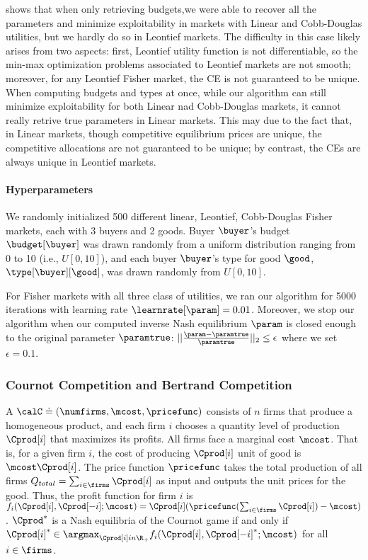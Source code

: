  shows that when only retrieving budgets,we were able to recover all the parameters and minimize exploitability in markets with Linear and Cobb-Douglas utilities, but we hardly do so in Leontief markets. The difficulty in this case likely arises from two aspects: first, Leontief utility function is not differentiable, so the min-max optimization problems associated to Leontief
markets are not smooth; moreover, for any Leontief Fisher market, the CE is not guaranteed to be unique. 
When computing budgets and types at once, while our algorithm can still minimize exploitability for both Linear nad Cobb-Douglas markets, it cannot really retrive true parameters in Linear markets. This may due to the fact that, in Linear markets, though competitive equilibrium prices are unique, the competitive allocations are not guaranteed to be unique; by contrast, the CEs are always unique in Leontief markets. 

\paragraph{Hyperparameters}
We randomly initialized 500 different linear, Leontief, Cobb-Douglas Fisher markets, each with 3 buyers and 2 goods. Buyer $\buyer$’s budget $\budget[\buyer]$ was drawn randomly from a uniform distribution ranging from 0 to 10 (i.e., $U[0,10]$), and each buyer $\buyer$’s type for good $\good$, $\type[\buyer][\good]$, was drawn randomly from $U[0,10]$. 

For Fisher markets with all three class of utilities, we ran our algorithm for 5000 iterations with learning rate $\learnrate[\param]=0.01$. Moreover, we stop our algorithm when our computed inverse Nash equilibrium $\param$ is closed enough to the original parameter $\paramtrue$: $||\frac{\param-\paramtrue}{\paramtrue}||_2\leq \epsilon$ where we set $\epsilon=0.1$.



\subsubsection{Cournot Competition and Bertrand Competition}
A  $\calC \doteq (\numfirms, \mcost, \pricefunc)$ consists of $n$ firms that produce a homogeneous product, and each firm $i$ chooses a quantity level of production $\Cprod[i]$ that maximizes its profits. All firms face a marginal cost $\mcost$. That is, for a given firm $i$, the cost of producing $\Cprod[i]$ unit of good is $\mcost\Cprod[i]$. The price function $\pricefunc$ takes the total production of all firms $Q_{total}=\sum_{i\in \firms}\Cprod[i]$ as input and outputs the unit prices for the good. Thus, the profit function for firm $i$ is $f_i(\Cprod[i], \Cprod[-i]; \mcost)=\Cprod[i](\pricefunc(\sum_{i\in \firms}\Cprod[i])-\mcost)$. $\Cprod^*$ is a Nash equilibria of the Cournot game if and only if $\Cprod[i]^* \in \argmax_{\Cprod[i]in \R_+} f_i(\Cprod[i], \Cprod[-i]^*; \mcost)$ for all $i\in \firms$.


